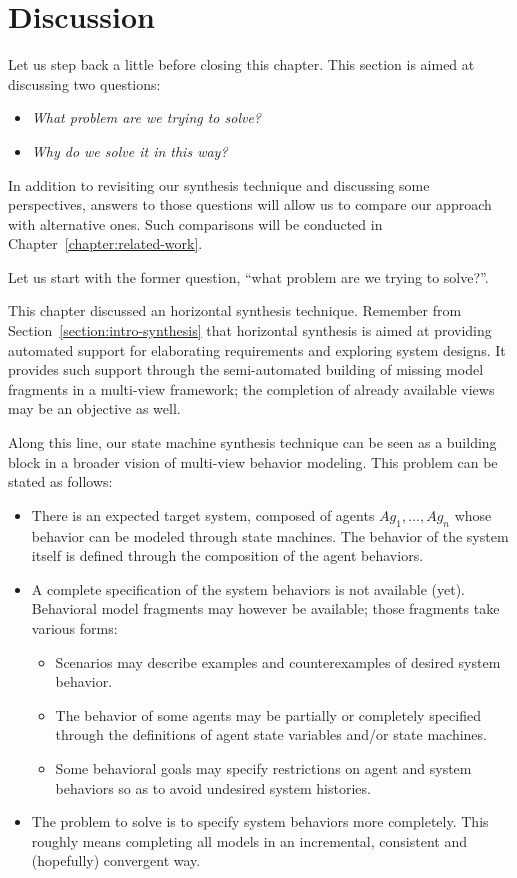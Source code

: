 \section{Discussion\label{section:inductive-discussion}}

Let us step back a little before closing this chapter. This section is aimed at discussing two questions:
\begin{itemize}
\item \emph{What problem are we trying to solve?}
\item \emph{Why do we solve it in this way?}
\end{itemize}
In addition to revisiting our synthesis technique and discussing some perspectives, answers to those questions will allow us to compare our approach with alternative ones. Such comparisons will be conducted in Chapter~\ref{chapter:related-work}. 

Let us start with the former question, ``what problem are we trying to solve?''. 

This chapter discussed an horizontal synthesis technique. Remember from Section~\ref{section:intro-synthesis} that horizontal synthesis is aimed at providing automated support for elaborating requirements and exploring system designs. It provides such support through the semi-automated building of missing model fragments in a multi-view framework; the completion of already available views may be an objective as well.

Along this line, our state machine synthesis technique can be seen as a building block in a broader vision of multi-view behavior modeling. This problem can be stated as follows:
\begin{itemize}
\item There is an expected target system, composed of agents $Ag_1, \ldots, Ag_n$ whose behavior can be modeled through state machines. The behavior of the system itself is defined through the composition of the agent behaviors.
\item A complete specification of the system behaviors is not available (yet). Behavioral model fragments may however be available; those fragments take various forms:
\begin{itemize}
\item Scenarios may describe examples and counterexamples of desired system behavior.
\item The behavior of some agents may be partially or completely specified through the definitions of agent state variables and/or state machines.
\item Some behavioral goals may specify restrictions on agent and system behaviors so as to avoid undesired system histories.
\end{itemize}
\item The problem to solve is to specify system behaviors more completely. This roughly means completing all models in an incremental, consistent and (hopefully) convergent way.
\end{itemize}

